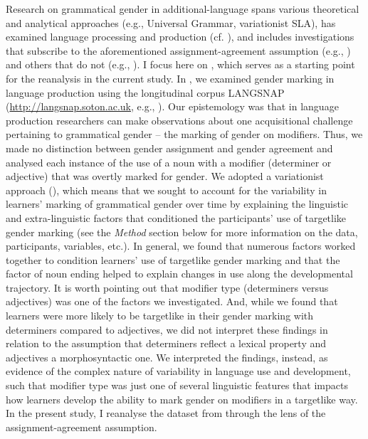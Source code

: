 \documentclass[output=paper,colorlinks,citecolor=brown,modfonts,nonflat]{../langscibook}
\begin{document}
Research on grammatical gender in additional-language  spans various theoretical and analytical approaches (e.g., Universal Grammar, variationist SLA), has examined language processing and production (cf. \citealt{Alarcón2014}), and includes investigations that subscribe to the aforementioned assignment-agreement assumption (e.g., \citealt{Alarcón2010,KupischEtAl2013}) and others that do not (e.g., \citealt{MontrulEtAl2008,GrüterEtAl2012,GudmestadEtAl2019}). I focus here on \citeauthor{GudmestadEtAl2019}, which serves as a starting point for the reanalysis in the current study. In \citeauthor{GudmestadEtAl2019}, we examined gender marking in language production using the longitudinal corpus LANGSNAP (\url{http://langsnap.soton.ac.uk}, e.g., \citealt{MitchellEtAl2017}). Our epistemology was that in language production researchers can make observations about one acquisitional challenge pertaining to grammatical gender – the marking of gender on modifiers. Thus, we made no distinction between gender assignment and gender agreement and analysed each instance of the use of a noun with a modifier (determiner or adjective) that was overtly marked for gender. We adopted a variationist approach (\citealt{GeeslinLong2014}), which means that we sought to account for the variability in learners’ marking of grammatical gender over time by explaining the linguistic and extra-linguistic factors that conditioned the participants’ use of targetlike gender marking (see the \textit{Method} section below for more information on the data, participants, variables, etc.). In general, we found that numerous factors worked together to condition learners’ use of targetlike gender marking and that the factor of noun ending helped to explain changes in use along the developmental trajectory. It is worth pointing out that modifier type (determiners versus adjectives) was one of the factors we investigated. And, while we found that learners were more likely to be targetlike in their gender marking with determiners compared to adjectives, we did not interpret these findings in relation to the assumption that determiners reflect a lexical property and adjectives a morphosyntactic one. We interpreted the findings, instead, as evidence of the complex nature of variability in language use and development, such that modifier type was just one of several linguistic features that impacts how learners develop the ability to mark gender on modifiers in a targetlike way. In the present study, I reanalyse the dataset from \citeauthor{GudmestadEtAl2019} through the lens of the assignment-agreement assumption.
\end{document}
